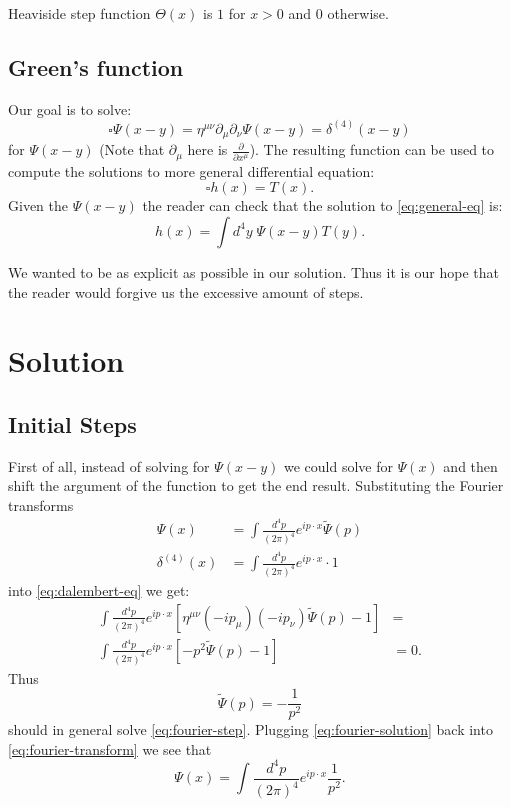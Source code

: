 \documentclass[aps,prd,final,twocolumn,floats,floatfix,nofootinbib,10pt]{revtex4-1}
\begin{document}
Heaviside step function $\Theta(x)$ is $1$ for $x > 0$ and $0$ otherwise.

\subsection{Green's function}

Our goal is to solve:
\begin{equation}\label{eq:dalembert-eq}
\square \Psi(x - y) = \eta^{\mu\nu} \partial_\mu \partial_\nu \Psi(x - y) = \delta^{(4)} (x - y)
\end{equation}
for $\Psi(x - y)$ (Note that $\partial_\mu$ here is $\frac{\partial}{\partial x^\mu}$).
The resulting function can be used to compute the solutions to more general differential equation:
\begin{equation}\label{eq:general-eq}
\square h(x) = T(x).
\end{equation}
Given the $\Psi(x - y)$ the reader can check that the solution to \eqref{eq:general-eq} is:
\begin{equation}
h(x) = \int d^4y \; \Psi(x - y) T(y).
\end{equation}

We wanted to be as explicit as possible in our solution. Thus it is our hope that the reader would forgive us the
excessive amount of steps.

\section{Solution}

\subsection{Initial Steps}

First of all, instead of solving for $\Psi(x - y)$ we could solve for $\Psi(x)$ and then shift the argument of the function
to get the end result. Substituting the Fourier transforms
\begin{align}\label{eq:fourier-transform}
\Psi(x) & = \int \frac{d^4p}{(2 \pi)^4} e^{i p \cdot x} \tilde{\Psi}(p) \\
\delta^{(4)} (x) & = \int \frac{d^4p}{(2 \pi)^4} e^{i p \cdot x} \cdot 1
\end{align}
into \eqref{eq:dalembert-eq} we get:
\begin{align}\label{eq:fourier-step}
\int \frac{d^4p}{(2 \pi)^4} e^{i p \cdot x} \left[ \eta^{\mu\nu} (-i p_\mu) (-i p_\nu) \tilde{\Psi}(p) - 1 \right] & = \\
\int \frac{d^4p}{(2 \pi)^4} e^{i p \cdot x} \left[ -p^2 \tilde{\Psi}(p) - 1 \right] & = 0.
\end{align}
Thus
\begin{equation}\label{eq:fourier-solution}
\tilde{\Psi}(p) = -\frac{1}{p^2}
\end{equation}
should in general solve \eqref{eq:fourier-step}. Plugging \eqref{eq:fourier-solution} back into
\eqref{eq:fourier-transform} we see that
\begin{equation}\label{eq:complex-integral}
\Psi(x) = \int \frac{d^4p}{(2 \pi)^4} e^{i p \cdot x} \frac{1}{p^2}.
\end{equation}
\end{document}
